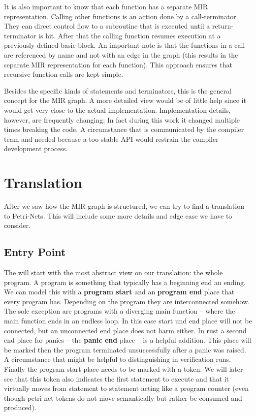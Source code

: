 It is also important to know that each function has a separate MIR representation.
Calling other functions is an action done by a call-terminator.
They can direct control flow to a subroutine that is executed until a return-terminator is hit.
After that the calling function resumes execution at a previously defined basic block.
An important note is that the functions in a call are referenced by name and not with an edge in the graph (this results in the separate MIR representation for each function).
This approach ensures that recursive function calls are kept simple.

Besides the specific kinds of statements and terminators, this is the general concept for the MIR graph.
A more detailed view would be of little help since it would get very close to the actual implementation.
Implementation details, however, are frequently changing;
In fact during this work it changed multiple times breaking the code.
A circumstance that is communicated by the compiler team and needed because a too stable API would restrain the compiler development process.


\section{Translation}
\label{app_trans}
After we saw how the MIR graph is structured, we can try to find a translation to Petri-Nets. This will include some more details and edge case we have to consider.

\subsection{Entry Point}
The will start with the most abstract view on our translation: the whole program.
A program is something that typically has a beginning end an ending.
We can model this with a \textbf{program start} and an \textbf{program end} place that every program has.
Depending on the program they are interconnected somehow.
The sole exception are programs with a diverging main function -- where the main function ends in an endless loop.
In this case start und end place will not be connected, but an unconnected end place does not harm either.
In rust a second end place for panics -- the \textbf{panic end} place -- is a helpful addition.
This place will be marked then the program terminated unsuccessfully after a panic was raised.
A circumstance that might be helpful to distinguishing in verification runs.
Finally the program start place needs to be marked with a token.
We will later see that this token also indicates the first statement to execute and that it virtually moves from statement to statement acting like a program counter (even though petri net tokens do not move semantically but rather be consumed and produced).

